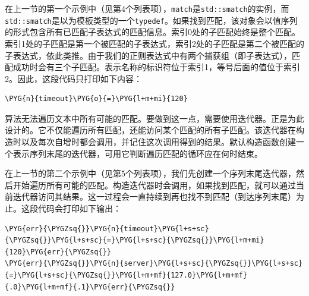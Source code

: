 
在上一节的第一个示例中（见第4个列表项），\texttt{match}是\texttt{std::\allowbreak{}smatch}的实例，而\texttt{std::\allowbreak{}smatch}是以为模板类型的一个\texttt{typedef}。如果找到匹配，该对象会以值序列的形式包含所有已匹配子表达式的匹配信息。索引0处的子匹配始终是整个匹配。索引1处的子匹配是第一个被匹配的子表达式，索引2处的子匹配是第二个被匹配的子表达式，依此类推。由于我们的正则表达式中有两个捕获组（即子表达式），匹配成功时会有三个子匹配。表示名称的标识符位于索引1，等号后面的值位于索引2。因此，这段代码只打印如下内容：



\begin{codeblockbg}
\begin{Verbatim}[commandchars=\\\{\},breaklines=true,breakanywhere=true,fontsize=\codefont,xleftmargin=17bp]
\PYG{n}{timeout}\PYG{o}{=}\PYG{l+m+mi}{120}
\end{Verbatim}
\end{codeblockbg}



算法无法遍历文本中所有可能的匹配。要做到这一点，需要使用迭代器。正是为此设计的。它不仅能遍历所有匹配，还能访问某个匹配的所有子匹配。该迭代器在构造时以及每次自增时都会调用，并记住这次调用得到的结果。默认构造函数创建一个表示序列末尾的迭代器，可用它判断遍历匹配的循环应在何时结束。



在上一节的第二个示例中（见第5个列表项），我们先创建一个序列末尾迭代器，然后开始遍历所有可能的匹配。构造迭代器时会调用，如果找到匹配，就可以通过当前迭代器访问其结果。这一过程会一直持续到再也找不到匹配（到达序列末尾）为止。这段代码会打印如下输出：



\begin{codeblockbg}
\begin{Verbatim}[commandchars=\\\{\},breaklines=true,breakanywhere=true,fontsize=\codefont,xleftmargin=17bp]
\PYG{err}{\PYGZsq{}}\PYG{n}{timeout}\PYG{l+s+sc}{\PYGZsq{}}\PYG{l+s+sc}{=}\PYG{l+s+sc}{\PYGZsq{}}\PYG{l+m+mi}{120}\PYG{err}{\PYGZsq{}}
\PYG{err}{\PYGZsq{}}\PYG{n}{server}\PYG{l+s+sc}{\PYGZsq{}}\PYG{l+s+sc}{=}\PYG{l+s+sc}{\PYGZsq{}}\PYG{l+m+mf}{127.0}\PYG{l+m+mf}{.0}\PYG{l+m+mf}{.1}\PYG{err}{\PYGZsq{}}
\end{Verbatim}
\end{codeblockbg}


